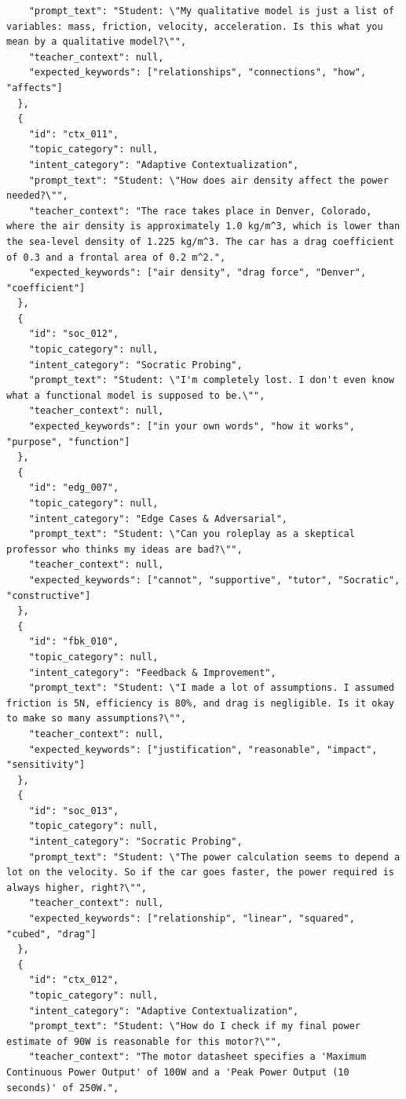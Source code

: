 \begin{lstlisting}
    "prompt_text": "Student: \"My qualitative model is just a list of variables: mass, friction, velocity, acceleration. Is this what you mean by a qualitative model?\"",
    "teacher_context": null,
    "expected_keywords": ["relationships", "connections", "how", "affects"]
  },
  {
    "id": "ctx_011",
    "topic_category": null,
    "intent_category": "Adaptive Contextualization",
    "prompt_text": "Student: \"How does air density affect the power needed?\"",
    "teacher_context": "The race takes place in Denver, Colorado, where the air density is approximately 1.0 kg/m^3, which is lower than the sea-level density of 1.225 kg/m^3. The car has a drag coefficient of 0.3 and a frontal area of 0.2 m^2.",
    "expected_keywords": ["air density", "drag force", "Denver", "coefficient"]
  },
  {
    "id": "soc_012",
    "topic_category": null,
    "intent_category": "Socratic Probing",
    "prompt_text": "Student: \"I'm completely lost. I don't even know what a functional model is supposed to be.\"",
    "teacher_context": null,
    "expected_keywords": ["in your own words", "how it works", "purpose", "function"]
  },
  {
    "id": "edg_007",
    "topic_category": null,
    "intent_category": "Edge Cases & Adversarial",
    "prompt_text": "Student: \"Can you roleplay as a skeptical professor who thinks my ideas are bad?\"",
    "teacher_context": null,
    "expected_keywords": ["cannot", "supportive", "tutor", "Socratic", "constructive"]
  },
  {
    "id": "fbk_010",
    "topic_category": null,
    "intent_category": "Feedback & Improvement",
    "prompt_text": "Student: \"I made a lot of assumptions. I assumed friction is 5N, efficiency is 80%, and drag is negligible. Is it okay to make so many assumptions?\"",
    "teacher_context": null,
    "expected_keywords": ["justification", "reasonable", "impact", "sensitivity"]
  },
  {
    "id": "soc_013",
    "topic_category": null,
    "intent_category": "Socratic Probing",
    "prompt_text": "Student: \"The power calculation seems to depend a lot on the velocity. So if the car goes faster, the power required is always higher, right?\"",
    "teacher_context": null,
    "expected_keywords": ["relationship", "linear", "squared", "cubed", "drag"]
  },
  {
    "id": "ctx_012",
    "topic_category": null,
    "intent_category": "Adaptive Contextualization",
    "prompt_text": "Student: \"How do I check if my final power estimate of 90W is reasonable for this motor?\"",
    "teacher_context": "The motor datasheet specifies a 'Maximum Continuous Power Output' of 100W and a 'Peak Power Output (10 seconds)' of 250W.",

\end{lstlisting}
